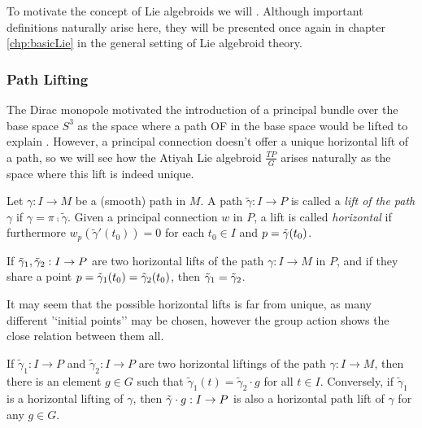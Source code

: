 To motivate the concept of Lie algebroids we will . Although important definitions naturally arise here, they will be presented once again in chapter \ref{chp:basicLie} in the general setting of Lie algebroid theory.


\subsubsection{Path Lifting}

The Dirac monopole motivated the introduction of a principal bundle over the base space $S^3$ as the space where a path OF in the base space would be lifted to explain . However, a principal connection doesn't offer a unique horizontal lift of a path, so we will see how the Atiyah Lie algebroid $\frac{TP}{G}$ arises naturally as the space where this lift is indeed unique.

\begin{definition} 
Let $\gamma: I \to M$ be a (smooth) path in $M$. A path $\tilde{\gamma}: I \to P$ is called a \emph{lift of the path $\gamma$} if $\gamma = \pi \comp \tilde{\gamma}$. Given a principal connection $w$ in $P$, a lift is called \emph{horizontal} if furthermore $w_p(\tilde{\gamma}'(t_0)) = 0$ for each $t_0 \in I$ and $p = \Tilde{\gamma}(t_0)$.
\end{definition}

\begin{lemma} 
If $\Tilde{\gamma}_1, \Tilde{\gamma}_2:I \to P$ are two horizontal lifts of the path $\gamma:I \to M$ in $P$, and if they share a point $p = \Tilde{\gamma}_1(t_0) = \Tilde{\gamma}_2(t_0)$, then $\Tilde{\gamma}_1 = \Tilde{\gamma}_2$. 
\end{lemma}


It may seem that the possible horizontal lifts is far from unique, as many different '`initial points'' may be chosen, however the group action shows the close relation between them all.

\begin{theorem}\label{thm:pathRed}
If $\tilde{\gamma}_1: I \to P$ and $\tilde{\gamma}_2: I \to P$ are two horizontal liftings of the path $\gamma:I \to M$, then there is an element $g \in G$ such that $\tilde{\gamma}_1 (t) = \tilde{\gamma}_2 \cdot g$ for all $t \in I$. Conversely, if $\tilde{\gamma}_1$ is a horizontal lifting of $\gamma$, then $\Tilde{\gamma}\cdot g :I \to P$ is also a horizontal path lift of $\gamma$ for any $g\in G$.
\end{theorem}

